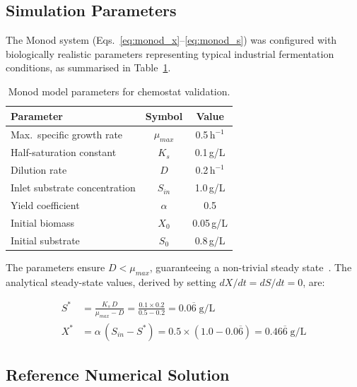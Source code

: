 \documentclass[14pt,a4paper,openany]{extbook}
\begin{document}
\subsection{Simulation Parameters}
\label{subsec:monod_params}

The Monod system (Eqs.~\eqref{eq:monod_x}--\eqref{eq:monod_s}) was configured with biologically realistic parameters representing typical industrial fermentation conditions, as summarised in Table~\ref{tab:params}.

\begin{table}[hbt]
\centering
\caption[Monod Model Parameters]{Monod model parameters for chemostat validation.}
\label{tab:params}
\begin{tabular}{lcc}
\hline
\textbf{Parameter} & \textbf{Symbol} & \textbf{Value} \\ \hline
Max.\ specific growth rate & $\mu_{max}$ & 0.5\,$\mathrm{h}^{-1}$ \\
Half-saturation constant & $K_s$ & 0.1\,g/L \\
Dilution rate & $D$ & 0.2\,$\mathrm{h}^{-1}$ \\
Inlet substrate concentration & $S_{in}$ & 1.0\,g/L \\
Yield coefficient & $\alpha$ & 0.5 \\
Initial biomass & $X_0$ & 0.05\,g/L \\
Initial substrate & $S_0$ & 0.8\,g/L \\ \hline
\end{tabular}
\end{table}

The parameters ensure $D < \mu_{max}$, guaranteeing a non-trivial steady state~\cite{smith2008monotone}. The analytical steady-state values, derived by setting $dX/dt = dS/dt = 0$, are:

\begin{align}
\label{eq:ss_s_impl}
S^* &= \frac{K_s\, D}{\mu_{max} - D} = \frac{0.1 \times 0.2}{0.5 - 0.2} = 0.0\overline{6}\;\text{g/L} \\[6pt]
\label{eq:ss_x_impl}
X^* &= \alpha\,(S_{in} - S^*) = 0.5 \times (1.0 - 0.0\overline{6}) = 0.46\overline{6}\;\text{g/L}
\end{align}

\subsection{Reference Numerical Solution}
\label{subsec:reference_solver}
\end{document}
